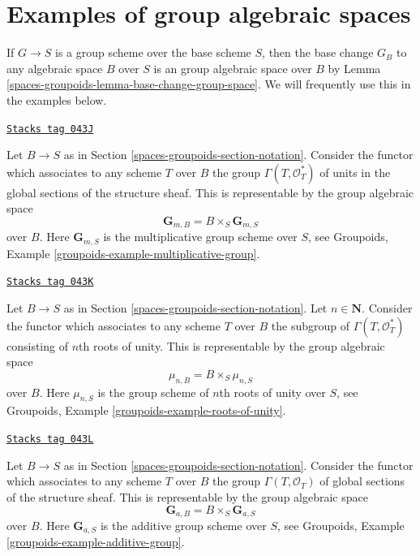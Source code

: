 \section{Examples of group algebraic spaces}
\label{spaces-groupoids-section-examples-group-spaces}
If $G \to S$ is a group scheme over the base scheme $S$, then the base
change $G_B$ to any algebraic space $B$ over $S$ is an group algebraic
space over $B$ by
Lemma \ref{spaces-groupoids-lemma-base-change-group-space}.
We will frequently use this in the examples below.

\begin{example}

\label{spaces-groupoids-example-multiplicative-group}
\href{https://stacks.math.columbia.edu/tag/043J}{\texttt{Stacks tag 043J}}

Let $B \to S$ as in Section \ref{spaces-groupoids-section-notation}.
Consider the functor which associates to any scheme $T$ over
$B$ the group $\Gamma(T, \mathcal{O}_T^*)$
of units in the global sections of the structure sheaf.
This is representable by the group algebraic space
$$
\mathbf{G}_{m, B} = B \times_S \mathbf{G}_{m, S}
$$
over $B$. Here $\mathbf{G}_{m, S}$ is the multiplicative group scheme
over $S$, see
Groupoids, Example \ref{groupoids-example-multiplicative-group}.
\end{example}

\begin{example}

\label{spaces-groupoids-example-roots-of-unity}
\href{https://stacks.math.columbia.edu/tag/043K}{\texttt{Stacks tag 043K}}

Let $B \to S$ as in Section \ref{spaces-groupoids-section-notation}.
Let $n \in \mathbf{N}$. Consider the functor which associates
to any scheme $T$ over $B$ the subgroup of $\Gamma(T, \mathcal{O}_T^*)$
consisting of $n$th roots of unity.
This is representable by the group algebraic space
$$
\mu_{n, B} = B \times_S \mu_{n, S}
$$
over $B$. Here $\mu_{n, S}$ is the group scheme of $n$th roots of
unity over $S$, see
Groupoids, Example \ref{groupoids-example-roots-of-unity}.
\end{example}

\begin{example}

\label{spaces-groupoids-example-additive-group}
\href{https://stacks.math.columbia.edu/tag/043L}{\texttt{Stacks tag 043L}}

Let $B \to S$ as in Section \ref{spaces-groupoids-section-notation}.
Consider the functor which associates
to any scheme $T$ over $B$ the group $\Gamma(T, \mathcal{O}_T)$
of global sections of the structure sheaf.
This is representable by the group algebraic space
$$
\mathbf{G}_{a, B} = B \times_S \mathbf{G}_{a, S}
$$
over $B$. Here $\mathbf{G}_{a, S}$ is the additive group scheme
over $S$, see
Groupoids, Example \ref{groupoids-example-additive-group}.
\end{example}

